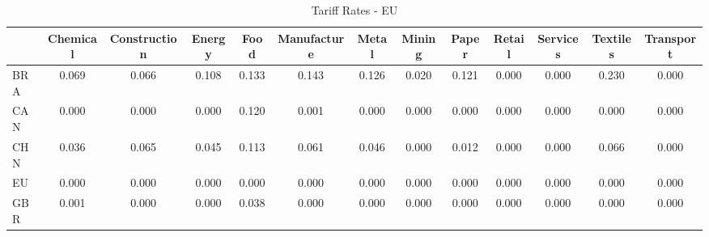 \begin{table}[htbp]
\centering
\caption{Tariff Rates - EU} 
\label{tab:tariffs_EU}
\begin{tabular}{lcccccccccccc}
  \hline
 & Chemical & Construction & Energy & Food & Manufacture & Metal & Mining & Paper & Retail & Services & Textiles & Transport \\ 
  \hline
BRA & \textcolor[RGB]{42,27,212}{0.069} & \textcolor[RGB]{47,30,208}{0.066} & \textcolor[RGB]{25,16,230}{0.108} & \textcolor[RGB]{8,5,246}{0.133} & \textcolor[RGB]{6,4,249}{0.143} & \textcolor[RGB]{11,7,244}{0.126} & \textcolor[RGB]{89,58,166}{0.020} & \textcolor[RGB]{13,8,242}{0.121} & \textcolor[RGB]{255,165,0}{0.000} & \textcolor[RGB]{255,165,0}{0.000} & \textcolor[RGB]{2,1,253}{0.230} & \textcolor[RGB]{255,165,0}{0.000} \\ 
  CAN & \textcolor[RGB]{255,165,0}{0.000} & \textcolor[RGB]{255,165,0}{0.000} & \textcolor[RGB]{255,165,0}{0.000} & \textcolor[RGB]{15,10,240}{0.120} & \textcolor[RGB]{104,67,151}{0.001} & \textcolor[RGB]{255,165,0}{0.000} & \textcolor[RGB]{255,165,0}{0.000} & \textcolor[RGB]{255,165,0}{0.000} & \textcolor[RGB]{255,165,0}{0.000} & \textcolor[RGB]{255,165,0}{0.000} & \textcolor[RGB]{255,165,0}{0.000} & \textcolor[RGB]{255,165,0}{0.000} \\ 
  CHN & \textcolor[RGB]{74,48,181}{0.036} & \textcolor[RGB]{49,32,206}{0.065} & \textcolor[RGB]{62,40,193}{0.045} & \textcolor[RGB]{19,12,236}{0.113} & \textcolor[RGB]{51,33,204}{0.061} & \textcolor[RGB]{59,38,196}{0.046} & \textcolor[RGB]{255,165,0}{0.000} & \textcolor[RGB]{96,62,159}{0.012} & \textcolor[RGB]{255,165,0}{0.000} & \textcolor[RGB]{255,165,0}{0.000} & \textcolor[RGB]{45,29,210}{0.066} & \textcolor[RGB]{255,165,0}{0.000} \\ 
  EU & \textcolor[RGB]{255,165,0}{0.000} & \textcolor[RGB]{255,165,0}{0.000} & \textcolor[RGB]{255,165,0}{0.000} & \textcolor[RGB]{255,165,0}{0.000} & \textcolor[RGB]{255,165,0}{0.000} & \textcolor[RGB]{255,165,0}{0.000} & \textcolor[RGB]{255,165,0}{0.000} & \textcolor[RGB]{255,165,0}{0.000} & \textcolor[RGB]{255,165,0}{0.000} & \textcolor[RGB]{255,165,0}{0.000} & \textcolor[RGB]{255,165,0}{0.000} & \textcolor[RGB]{255,165,0}{0.000} \\ 
  GBR & \textcolor[RGB]{106,69,149}{0.001} & \textcolor[RGB]{255,165,0}{0.000} & \textcolor[RGB]{255,165,0}{0.000} & \textcolor[RGB]{70,45,185}{0.038} & \textcolor[RGB]{255,165,0}{0.000} & \textcolor[RGB]{255,165,0}{0.000} & \textcolor[RGB]{255,165,0}{0.000} & \textcolor[RGB]{255,165,0}{0.000} & \textcolor[RGB]{255,165,0}{0.000} & \textcolor[RGB]{255,165,0}{0.000} & \textcolor[RGB]{255,165,0}{0.000} & \textcolor[RGB]{255,165,0}{0.000} \\ 

\end{tabular}
\end{table}
